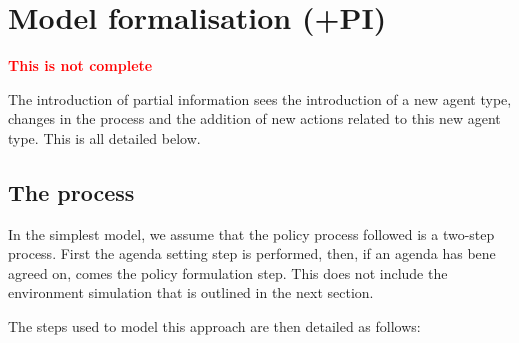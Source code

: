 \documentclass[11pt]{article}
\begin{document}


\section{Model formalisation (+PI)}

{\bfseries \textcolor{red}{This is not complete}}

The introduction of partial information sees the introduction of a new agent type, changes in the process and the addition of new actions related to this new agent type. This is all detailed below.

\subsection{The process}

In the simplest model, we assume that the policy process followed is a two-step process. First the agenda setting step is performed, then, if an agenda has bene agreed on, comes the policy formulation step. This does not include the environment simulation that is outlined in the next section.

The steps used to model this approach are then detailed as follows:
\end{document}
